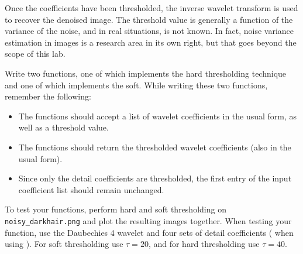 Once the coefficients have been thresholded, the inverse wavelet transform is used to recover the denoised image.
The threshold value is generally a function of the variance of the noise, and in real situations, is not known.
In fact, noise variance estimation in images is a research area in its own right, but that goes beyond the scope of this lab.


\begin{problem}
Write two functions, one of which implements the hard thresholding technique and one of which implements the soft.
While writing these two functions, remember the following:
\begin{itemize}
\item The functions should accept a list of wavelet coefficients in the usual form, as well as a threshold value.
\item The functions should return the thresholded wavelet coefficients (also in the usual form).
\item Since only the detail coefficients are thresholded, the first entry of the input coefficient list should remain unchanged.
\end{itemize}
To test your functions, perform hard and soft thresholding on \texttt{noisy\_darkhair.png} and plot the resulting images together.
When testing your function, use the Daubechies 4 wavelet and four sets of detail coefficients ( when using ).
For soft thresholding use $\tau=20$, and for hard thresholding use $\tau=40$.
\end{problem}

